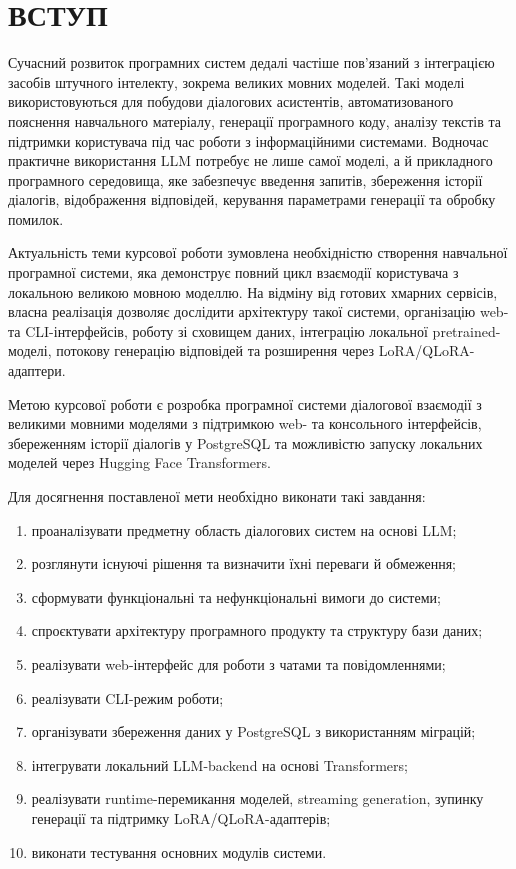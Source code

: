 \section*{ВСТУП}

Сучасний розвиток програмних систем дедалі частіше пов'язаний з інтеграцією засобів штучного інтелекту, зокрема великих мовних моделей. Такі моделі використовуються для побудови діалогових асистентів, автоматизованого пояснення навчального матеріалу, генерації програмного коду, аналізу текстів та підтримки користувача під час роботи з інформаційними системами. Водночас практичне використання LLM потребує не лише самої моделі, а й прикладного програмного середовища, яке забезпечує введення запитів, збереження історії діалогів, відображення відповідей, керування параметрами генерації та обробку помилок.

Актуальність теми курсової роботи зумовлена необхідністю створення навчальної програмної системи, яка демонструє повний цикл взаємодії користувача з локальною великою мовною моделлю. На відміну від готових хмарних сервісів, власна реалізація дозволяє дослідити архітектуру такої системи, організацію web- та CLI-інтерфейсів, роботу зі сховищем даних, інтеграцію локальної pretrained-моделі, потокову генерацію відповідей та розширення через LoRA/QLoRA-адаптери.

Метою курсової роботи є розробка програмної системи діалогової взаємодії з великими мовними моделями з підтримкою web- та консольного інтерфейсів, збереженням історії діалогів у PostgreSQL та можливістю запуску локальних моделей через Hugging Face Transformers.

Для досягнення поставленої мети необхідно виконати такі завдання:
\begin{enumerate}
  \item проаналізувати предметну область діалогових систем на основі LLM;
  \item розглянути існуючі рішення та визначити їхні переваги й обмеження;
  \item сформувати функціональні та нефункціональні вимоги до системи;
  \item спроєктувати архітектуру програмного продукту та структуру бази даних;
  \item реалізувати web-інтерфейс для роботи з чатами та повідомленнями;
  \item реалізувати CLI-режим роботи;
  \item організувати збереження даних у PostgreSQL з використанням міграцій;
  \item інтегрувати локальний LLM-backend на основі Transformers;
  \item реалізувати runtime-перемикання моделей, streaming generation, зупинку генерації та підтримку LoRA/QLoRA-адаптерів;
  \item виконати тестування основних модулів системи.
\end{enumerate}

